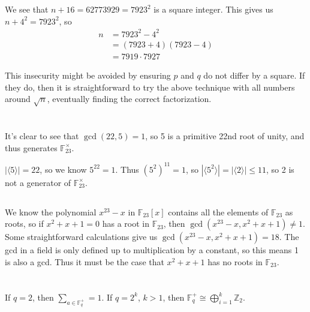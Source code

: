 \documentclass[11pt]{article}
\begin{document}
\renewcommand{\thesubsection}{\thesection.\alph{subsection}}
\section{} %
We see that $n+16=62773929=7923^2$ is a square integer.
This gives us $n + 4^2 = 7923^2$, so
\begin{align*}
	n &= 7923^2 -4^2\\
	&= (7923+4)(7923-4)\\
	&= 7919 \cdot 7927
\end{align*}

This insecurity might be avoided by ensuring $p$ and $q$ do not differ by a square.
If they do, then it is straightforward to try the above technique with all numbers around $\sqrt{n}$, eventually finding the correct factorization.


\section{} %
\subsection{} %
It's clear to see that $\gcd(22,5)=1$, so 5 is a primitive 22nd root of unity, and thus generates $\mathbb{F}_{23}^\times$.

$\left|\langle5\rangle\right|=22$, so we know $5^{22}=1$.
Thus $(5^2)^{11}=1$, so $\left|\langle5^2\rangle\right|=\left|\langle2\rangle\right|\le11$, so 2 is not a generator of $\mathbb{F}_{23}^\times$.


\subsection{} %
We know the polynomial $x^{23}-x$ in $\mathbb{F}_{23}\left[x\right]$ contains all the elements of $\mathbb{F}_{23}$ as roots, so if $x^2+x+1=0$ has a root in $\mathbb{F}_{23}$, then $\gcd(x^{23}-x, x^2+x+1)\neq1$.
Some straightforward calculations give us $\gcd(x^{23}-x, x^2+x+1)=18$.
The gcd in a field is only defined up to multiplication by a constant, so this means 1 is also a gcd.
Thus it must be the case that $x^2+x+1$ has no roots in $\mathbb{F}_{23}$.


\section{} %
\subsection{} %
If $q=2$, then $\sum_{a\in\mathbb{F}_q^+}=1$.
If $q=2^k$, $k>1$, then $\mathbb{F}_q^+\cong\bigoplus_{i=1}^k\mathbb{Z}_2$.
\end{document}
